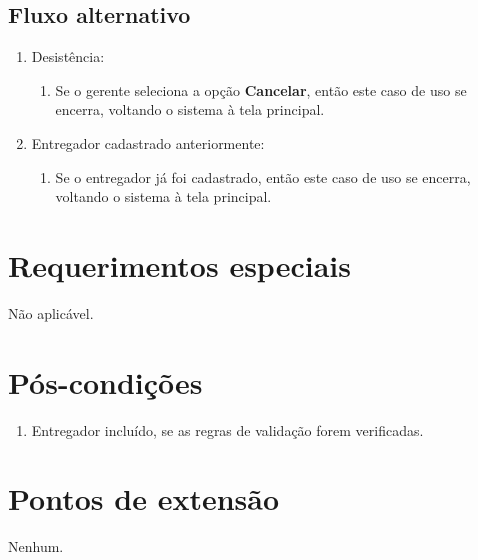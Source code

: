 \subsection{Fluxo alternativo}

\begin{enumerate}
	\item Desistência:
	\begin{enumerate}
		\item Se o gerente seleciona a opção \textbf{Cancelar}, então este caso de uso se encerra, voltando o sistema à tela principal.
	\end{enumerate}
	\item Entregador cadastrado anteriormente:
	\begin{enumerate}
		\item Se o entregador já foi cadastrado, então este caso de uso se encerra, voltando o
		sistema à tela principal.
	\end{enumerate}
\end{enumerate}

\section{Requerimentos especiais}

Não aplicável.

\section{Pós-condições}

\begin{enumerate}
	\item Entregador incluído, se as regras de validação forem verificadas.
\end{enumerate}

\section{Pontos de extensão}

Nenhum.